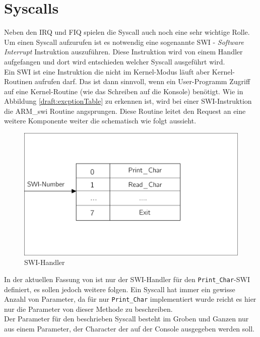 \section{Syscalls}
Neben den IRQ und FIQ spielen die Syscall auch noch eine sehr wichtige Rolle. Um einen Syscall aufzurufen ist es notwendig eine sogenannte SWI - \textit{Software Interrupt} Instruktion auszuf\"uhren. Diese Instruktion wird von einem Handler aufgefangen und dort wird entschieden welcher Syscall ausgef\"uhrt wird.\\
Ein SWI ist eine Instruktion die nicht im Kernel-Modus l\"auft aber Kernel-Routinen aufrufen darf. Das ist dann sinnvoll, wenn ein User-Programm Zugriff auf eine Kernel-Routine (wie das Schreiben auf die Konsole) ben\"otigt. Wie in Abbildung \ref{draft:excptionTable} zu erkennen ist, wird bei einer SWI-Instruktion die ARM\_swi Routine angsprungen. Diese Routine leitet den Request an eine weitere Komponente weiter die schematisch wie folgt aussieht.
\begin{figure}[H]
	\begin{center}	
	\caption{SWI-Handler}
	\includegraphics[scale=0.60]{common/swihandler.pdf}
	\end{center}
\end{figure}
\noindent
In der aktuellen Fassung von \mops ist nur der SWI-Handler f\"ur den \texttt{Print\_Char}-SWI definiert, es sollen jedoch weitere folgen. Ein Syscall hat immer ein gewisse Anzahl von Parameter, da f\"ur \mops nur \texttt{Print\_Char} implementiert wurde reicht es hier nur die Parameter von dieser Methode zu beschreiben.\\ 
Der Parameter f\"ur den beschrieben Syscall besteht im Groben und Ganzen nur aus einem Parameter, der Character der auf der Console ausgegeben werden soll.
\newpage
